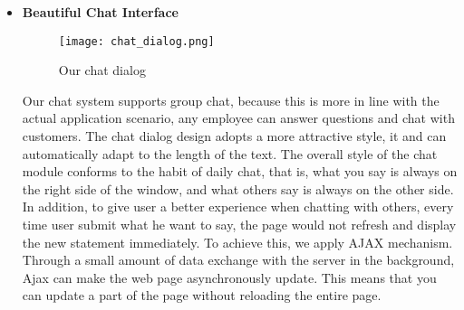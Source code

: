 \documentclass[a4paper]{article}
\begin{document}
\begin{itemize}
     \item \textbf{Beautiful Chat Interface}
     \begin{figure}[h]
         \centering
         \texttt{[image: chat\_dialog.png]}
         \caption{Our chat dialog}
         \label{chat_dialog}
     \end{figure}
     \newline
     Our chat system supports group chat, because this is more in line with the actual application scenario, any employee can answer questions and chat with customers. The chat dialog design adopts a more attractive style, it and can automatically adapt to the length of the text. The overall style of the chat module conforms to the habit of daily chat, that is, what you say is always on the right side of the window, and what others say is always on the other side. 
     \newline
     In addition, to give user a better experience when chatting with others, every time user submit what he want to say, the page would not refresh and display the new statement immediately. To achieve this, we apply AJAX mechanism. Through a small amount of data exchange with the server in the background, Ajax can make the web page asynchronously update. This means that you can update a part of the page without reloading the entire page.
\end{itemize}
\end{document}
